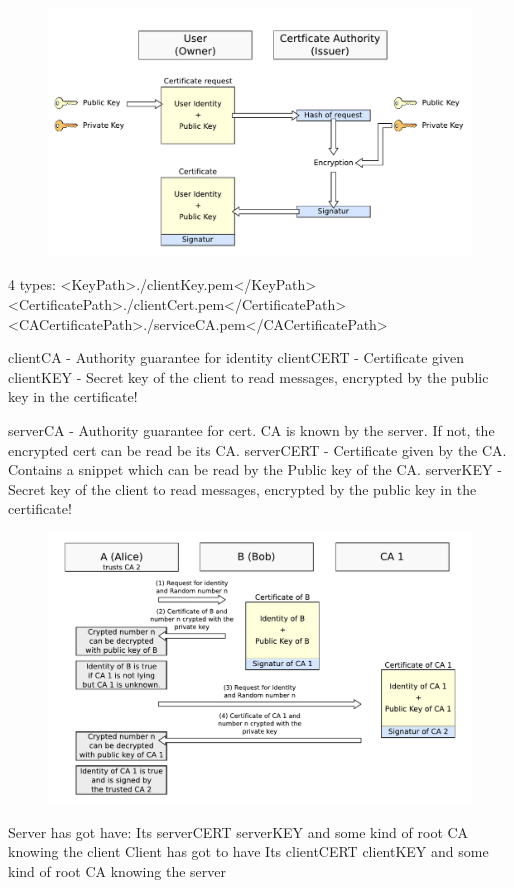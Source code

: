 \begin{figure}[htb]
	\centering%
 	\includegraphics[width=13cm]{tex_tls_echoservice/certificates.pdf}
\label{fig:HED_internal2}
\end{figure}

4 types:
                <KeyPath>./clientKey.pem</KeyPath>
                <CertificatePath>./clientCert.pem</CertificatePath>
                <CACertificatePath>./serviceCA.pem</CACertificatePath>


clientCA   - Authority guarantee for identity
clientCERT - Certificate given
clientKEY  - Secret key of the client to read messages, encrypted by the public key in the certificate!

serverCA   - Authority guarantee for cert. CA is known by the server. If not, the encrypted cert can be read be its CA.
serverCERT - Certificate given by the CA. Contains a snippet which can be read by the Public key of the CA.
serverKEY  - Secret key of the client to read messages, encrypted by the public key in the certificate!

\begin{figure}[htb]
	\centering%
	\includegraphics[width=13cm]{tex_tls_echoservice/verification.pdf}
\label{fig:HED_internal3}
\end{figure}
Server has got have:
Its  serverCERT serverKEY and some kind of root CA knowing the client
Client has got to have
Its  clientCERT clientKEY and some kind of root CA knowing the server


